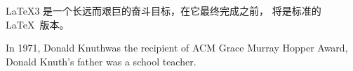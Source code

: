 \documentclass{book}
\newcommand{\mycmdA}{Donald Knuth}
\begin{document}
\LaTeX3 是一个长远而艰巨的奋斗目标，在它最终完成之前，\LaTeXe{} 将是标准的 \LaTeX\ 版本。
\par
In 1971, \mycmdA was the recipient of ACM Grace Murray Hopper Award, \mycmdA 's father was a school teacher.
\end{document}
